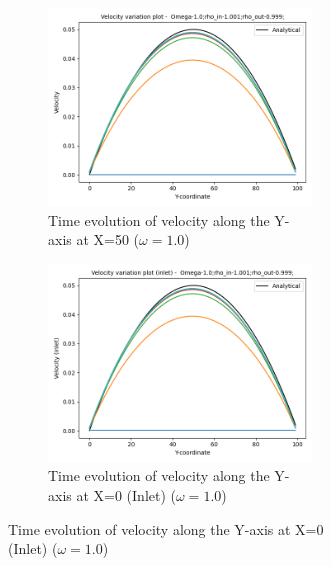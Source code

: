 \documentclass[a4paper,11pt]{report}
\begin{document}
\begin{figure}[h!]
\begin{subfigure}{\textwidth}
    \begin{subfigure}{0.5\textwidth}
        \centering
        \includegraphics[width=0.8\linewidth]{HPC_report/images/poiseuille/o1/Combined_plot-Y-coordinate-Velocity.png}
        \captionsetup{font=small}
        \caption{Time evolution of velocity along the Y-axis at X=50 ($\omega = 1.0$)}
        \label{fig:p_velocity}
    \end{subfigure}
    \begin{subfigure}{0.5\textwidth}
        \includegraphics[width=0.8\linewidth]{HPC_report/images/poiseuille/o1/Combined_plot-Y-coordinate-Velocity (inlet).png}
        \captionsetup{font=small}
        \caption{Time evolution of velocity along the Y-axis at X=0 (Inlet) ($\omega = 1.0$)}
        \label{fig:p_velocity_inlet}
    \end{subfigure}
\end{subfigure}
\begin{subfigure}{\textwidth}

\end{subfigure}
\end{figure}
\end{document}
